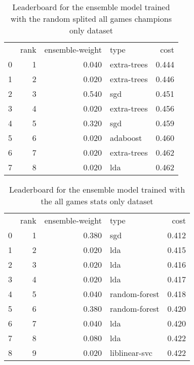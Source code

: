 \begin{table}[]
	\centering
	\begin{tabular}{lrrlr}
		  & rank & ensemble-weight & type        & cost  \\
		0 & 1    & 0.040           & extra-trees & 0.444 \\
		1 & 2    & 0.020           & extra-trees & 0.446 \\
		2 & 3    & 0.540           & sgd         & 0.451 \\
		3 & 4    & 0.020           & extra-trees & 0.456 \\
		4 & 5    & 0.320           & sgd         & 0.459 \\
		5 & 6    & 0.020           & adaboost    & 0.460 \\
		6 & 7    & 0.020           & extra-trees & 0.462 \\
		7 & 8    & 0.020           & lda         & 0.462 \\
	\end{tabular}

	\caption{Leaderboard for the ensemble model trained with the random splited all games champions only dataset}
	\label{tab:lb-all-games-champs-only-randsplit}
\end{table}

\begin{table}[]
	\centering
	\begin{tabular}{lrrlr}
		  & rank & ensemble-weight & type          & cost  \\
		0 & 1    & 0.380           & sgd           & 0.412 \\
		1 & 2    & 0.020           & lda           & 0.415 \\
		2 & 3    & 0.020           & lda           & 0.416 \\
		3 & 4    & 0.020           & lda           & 0.417 \\
		4 & 5    & 0.040           & random-forest & 0.418 \\
		5 & 6    & 0.380           & random-forest & 0.420 \\
		6 & 7    & 0.040           & lda           & 0.420 \\
		7 & 8    & 0.080           & lda           & 0.422 \\
		8 & 9    & 0.020           & liblinear-svc & 0.422 \\
	\end{tabular}

	\caption{Leaderboard for the ensemble model trained with the all games stats only dataset}
	\label{tab:lb-all-games-champ-stats-only}
\end{table}

